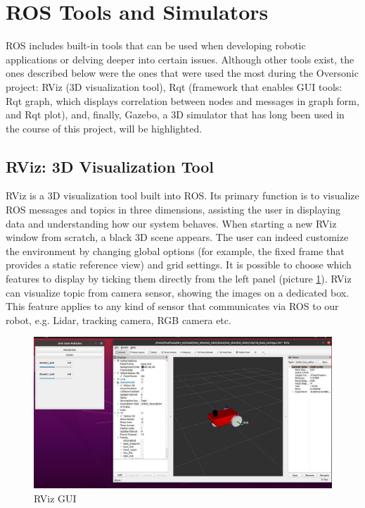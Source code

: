 \section{ROS Tools and Simulators}
ROS includes built-in tools that can be used when developing robotic applications or delving deeper into certain issues.
Although other tools exist, the ones described below were the ones that were used the most during the Oversonic project: RViz (3D visualization tool), Rqt (framework that enables GUI tools: Rqt graph, which displays correlation between nodes and messages in graph form, and Rqt plot), and, finally, Gazebo, a 3D simulator that has long been used in the course of this project, will be highlighted.
\subsection{RViz: 3D Visualization Tool}
RViz is a 3D visualization tool built into ROS.
Its primary function is to visualize ROS messages and topics in three dimensions, assisting the user in displaying data and understanding how our system behaves.
When starting a new RViz window from scratch, a black 3D scene appears. The user can indeed customize the environment by changing global options (for example, the fixed frame that provides a static reference view) and grid settings.
It is possible to choose which features to display by ticking them directly from the left panel (picture \ref{fig:rvizgui}).
RViz can visualize topic from camera sensor, showing the images on a dedicated box. This feature applies to any kind of sensor that communicates via ROS to our robot, e.g. Lidar, tracking camera, RGB camera etc. 
\begin{figure}[H]
    \centering
    \includegraphics[scale = 0.5]{Images/Chapter 2/rviz.jpg}
    \caption{RViz GUI}
    \label{fig:rvizgui}
\end{figure}
